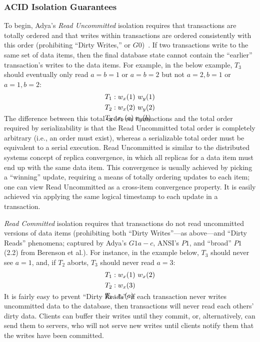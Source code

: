 \subsubsection{ACID Isolation Guarantees}

To begin, Adya's \textit{Read Uncommitted} isolation requires that
transactions are totally ordered and that writes within transactions
are ordered consistently with this order (prohibiting ``Dirty
Writes,'' or $G0$)~\cite{adya}. If two transactions write to the same
set of data items, then the final database state cannot contain the
``earlier'' transaction's writes to the data items. For example, in
the below example, $T_3$ should eventually only read $a=b=1$ or
$a=b=2$ but not $a=2, b=1$ or $a=1, b=2$:
\begin{align*}
\small
T_1 &: w_x(1)~w_y(1)
\\T_2 &: w_x(2)~w_y(2)
\\T_3 &: r_x(a)~r_y(b)\\[-2em]
\end{align*}
The difference between this total order on transactions and the total
order required by serializability is that the Read Uncommitted total
order is completely arbitrary (i.e., an order must exist), whereas a
serializable total order must be equivalent to a serial
execution. Read Uncommitted is similar to the distributed systems
concept of replica convergence, in which all replicas for a data item
must end up with the same data item. This convergence is usually
achieved by picking a ``winning'' update, requiring a means of totally
ordering updates to each item; one can view Read Uncommitted as a
cross-item convergence property. It is easily achieved via applying
the same logical timestamp to each update in a transaction.

\textit{Read Committed} isolation requires that transactions do not
read uncommitted versions of data items (prohibiting both ``Dirty
Writes''---as above---and ``Dirty Reads'' phenomena; captured by
Adya's $G1a-c$, ANSI's $P1$, and ``broad'' $P1$ (2.2) from Berenson et
al.). For instance, in the example below, $T_3$ should never see
$a=1$, and, if $T_2$ aborts, $T_3$ should never read $a=3$:
\vspace{-.5em}
\begin{align*}
\small
T_1 &: w_x(1)~w_x(2)
\\T_2 &: w_x(3)\\
T_3 &: r_x(a)\\[-2em]
\end{align*}
It is fairly easy to prvent ``Dirty Reads'': if each transaction never
writes uncommitted data to the database, then transactions will never
read each others' dirty data. Clients can buffer their writes until
they commit, or, alternatively, can send them to servers, who will not
serve new writes until clients notify them that the writes have been
committed.

